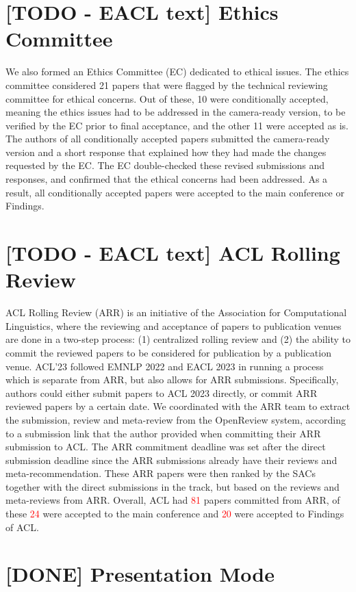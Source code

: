 \section*{[TODO - EACL text] Ethics Committee}
We also formed an Ethics Committee (EC) dedicated to ethical issues. The ethics committee considered 21 papers that were flagged by the technical reviewing committee for ethical concerns. Out of these, 10 were conditionally accepted, meaning the ethics issues had to be addressed in the camera-ready version, to be verified by the EC prior to final acceptance, and the other 11 were accepted as is. The authors of all conditionally accepted papers submitted the camera-ready version and a short response that explained how they had made the changes requested by the EC. The EC double-checked these revised submissions and responses, and confirmed that the ethical concerns had been addressed. As a result, all conditionally accepted papers were accepted to the main conference or Findings.

\section*{[TODO - EACL text] ACL Rolling Review}
ACL Rolling Review (ARR) is an initiative of the Association for Computational Linguistics, where the reviewing and acceptance of papers to publication venues are done in a two-step process: (1) centralized rolling review and (2) the ability to commit the reviewed papers to be considered for publication by a publication venue. ACL'23 followed EMNLP 2022 and EACL 2023 in running a process which is separate from ARR, but also allows for ARR submissions. Specifically, authors could either submit papers to ACL 2023 directly, or commit ARR reviewed papers by a certain date. We coordinated with the ARR team to extract the submission, review and meta-review from the OpenReview system, according to a submission link that the author provided when committing their ARR submission to ACL. The ARR commitment deadline was set  after the direct submission deadline since the ARR submissions already have their reviews and meta-recommendation. These ARR papers were then ranked by the SACs together with the direct submissions in the track, but based on the reviews and meta-reviews from ARR. Overall, ACL had \textcolor{red}{81} papers committed from ARR, of these \textcolor{red}{24} were accepted to the main conference and \textcolor{red}{20} were accepted to Findings of ACL.

\section*{[DONE] Presentation Mode}

